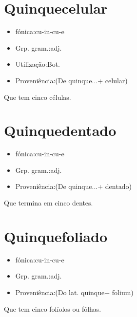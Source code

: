 \section{Quinquecelular}
\begin{itemize}
\item {fónica:cu-in-cu-e}
\end{itemize}
\begin{itemize}
\item {Grp. gram.:adj.}
\end{itemize}
\begin{itemize}
\item {Utilização:Bot.}
\end{itemize}
\begin{itemize}
\item {Proveniência:(De \textunderscore quinque...\textunderscore  + \textunderscore celular\textunderscore )}
\end{itemize}
Que tem cinco células.
\section{Quinquedentado}
\begin{itemize}
\item {fónica:cu-in-cu-e}
\end{itemize}
\begin{itemize}
\item {Grp. gram.:adj.}
\end{itemize}
\begin{itemize}
\item {Proveniência:(De \textunderscore quinque...\textunderscore  + \textunderscore dentado\textunderscore )}
\end{itemize}
Que termina em cinco dentes.
\section{Quinquefoliado}
\begin{itemize}
\item {fónica:cu-in-cu-e}
\end{itemize}
\begin{itemize}
\item {Grp. gram.:adj.}
\end{itemize}
\begin{itemize}
\item {Proveniência:(Do lat. \textunderscore quinque\textunderscore  + \textunderscore folium\textunderscore )}
\end{itemize}
Que tem cinco folíolos ou fôlhas.
